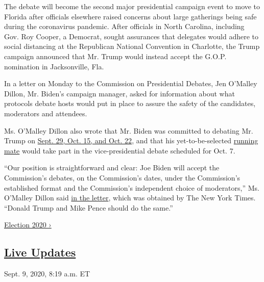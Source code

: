 The debate will become the second major presidential campaign event to
move to Florida after officials elsewhere raised concerns about large
gatherings being safe during the coronavirus pandemic. After officials
in North Carolina, including Gov. Roy Cooper, a Democrat, sought
assurances that delegates would adhere to social distancing at the
Republican National Convention in Charlotte, the Trump campaign
announced that Mr. Trump would instead accept the G.O.P. nomination in
Jacksonville, Fla.

In a letter on Monday to the Commission on Presidential Debates, Jen
O'Malley Dillon, Mr. Biden's campaign manager, asked for information
about what protocols debate hosts would put in place to assure the
safety of the candidates, moderators and attendees.

Ms. O'Malley Dillon also wrote that Mr. Biden was committed to debating
Mr. Trump on
\href{https://www.nytimes3xbfgragh.onion/interactive/2019/us/elections/2020-presidential-election-calendar.html}{Sept.
29, Oct. 15, and Oct. 22}, and that his yet-to-be-selected
\href{https://www.nytimes3xbfgragh.onion/article/biden-vice-president-2020.html}{running
mate} would take part in the vice-presidential debate scheduled for Oct.
7.

``Our position is straightforward and clear: Joe Biden will accept the
Commission's debates, on the Commission's dates, under the Commission's
established format and the Commission's independent choice of
moderators,'' Ms. O'Malley Dillon said
\href{https://int.graylady3jvrrxbe.onion/data/documenthelper/7038-biden-letter-to-debate-commission/94c02d45d35cdd5b9865/optimized/full.pdf\#page=1}{in
the letter}, which was obtained by The New York Times. ``Donald Trump
and Mike Pence should do the same.''

\href{https://www.nytimes3xbfgragh.onion/news-event/2020-election}{Election
2020 ›}

\hypertarget{live-updates}{%
\subsection{\texorpdfstring{\href{https://www.nytimes3xbfgragh.onion/live/2020/09/09/us/trump-vs-biden}{Live
Updates}}{Live Updates}}\label{live-updates}}

\href{https://www.nytimes3xbfgragh.onion/live/2020/09/09/us/trump-vs-biden\#the-nras-new-candidate-grades-show-a-continuing-decline}{}

Sept. 9, 2020, 8:19 a.m. ET

